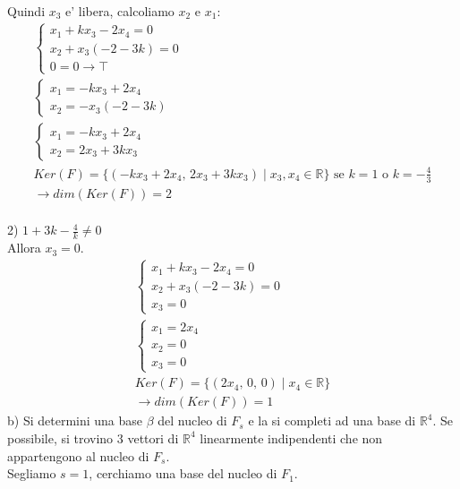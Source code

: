 \documentclass{article}
\begin{document}
\\Quindi $x_3$ e' libera, calcoliamo $x_2$ e $x_1$:
\begin{align*}
    \begin{cases}
        x_1+kx_3-2x_4=0 \\
        x_2+x_3(-2-3k)=0 \\
        0 = 0 \to \top
    \end{cases}
    \\
    \begin{cases}
        x_1=-kx_3+2x_4 \\
        x_2=-x_3(-2-3k) 
    \end{cases}
    \\
    \begin{cases}
        x_1=-kx_3+2x_4 \\
        x_2=2x_3+3kx_3 
    \end{cases}
    \\
    Ker(F)=\{(-kx_3+2x_4, \, 2x_3+3kx_3) \mid x_3,x_4 \in \mathbb{R}\} \text{ se $k=1$ o $k=-\frac{4}{3}$}
    \\ \to dim(Ker(F))=2
\end{align*}
\\2) $1+3k-\frac{4}{k}\neq0$
\\Allora $x_3 = 0$.
\begin{align*}
    \begin{cases}
        x_1+kx_3-2x_4=0 \\
        x_2+x_3(-2-3k)=0 \\
        x_3 = 0 
    \end{cases}
    \\
    \begin{cases}
        x_1=2x_4 \\
        x_2=0 \\
        x_3=0
    \end{cases}
    \\
    Ker(F)=\{(2x_4, \, 0, \, 0) \mid x_4 \in \mathbb{R}\}
    \\ \to dim(Ker(F))=1
\end{align*}
b) Si determini una base $\beta$ del nucleo di $F_s$ e la si completi ad una base di $\mathbb{R}^4$. Se possibile, si trovino 3 vettori di $\mathbb{R}^4$ linearmente indipendenti che non appartengono al nucleo di $F_s$.
\\Segliamo $s=1$, cerchiamo una base del nucleo di $F_1$.
\end{document}
